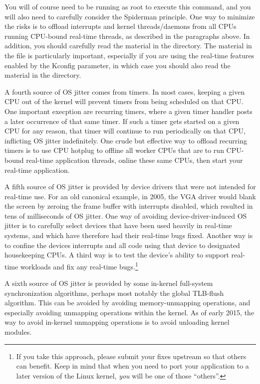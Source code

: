 You will of course need to be running as root to execute this command,
and you will also need to carefully consider the Spiderman principle.
One way to minimize the risks is to offload interrupts and
kernel threads/daemons from all CPUs running CPU-bound real-time
threads, as described in the paragraphs above.
In addition, you should carefully read the material in the
 directory.
The material in the  file is particularly
important, especially if you are using the  real-time features
enabled by the  Kconfig parameter, in which
case you should also read the material in the
 directory.

A fourth source of OS jitter comes from timers.
In most cases, keeping a given CPU out of the kernel will prevent
timers from being scheduled on that CPU.
One important execption are recurring timers, where a given timer
handler posts a later occurrence of that same timer.
If such a timer gets started on a given CPU for any reason, that
timer will continue to run periodically on that CPU, inflicting
OS jitter indefinitely.
One crude but effective way to offload recurring timers is to
use CPU hotplug to offline all worker CPUs that are to run CPU-bound
real-time application threads, online these same CPUs, then start
your real-time application.

A fifth source of OS jitter is provided by device drivers that were
not intended for real-time use.
For an old canonical example, in 2005, the VGA driver would blank
the screen by zeroing the frame buffer with interrupts disabled,
which resulted in tens of milliseconds of OS jitter.
One way of avoiding device-driver-induced OS jitter is to carefully
select devices that have been used heavily in real-time systems,
and which have therefore had their real-time bugs fixed.
Another way is to confine the devices interrupts and all code using
that device to designated housekeeping CPUs.
A third way is to test the device's ability to support real-time
workloads and fix any real-time bugs.\footnote{
	If you take this approach, please submit your fixes upstream
	so that others can benefit.
	Keep in mind that when you need to port your application to
	a later version of the Linux kernel, \emph{you} will be one of those
	``others''.}

A sixth source of OS jitter is provided by some in-kernel
full-system synchronization algorithms, perhaps most notably
the global TLB-flush algorithm.
This can be avoided by avoiding memory-unmapping operations, and especially
avoiding unmapping operations within the kernel.
As of early 2015, the way to avoid in-kernel
unmapping operations is to avoid unloading kernel modules.

